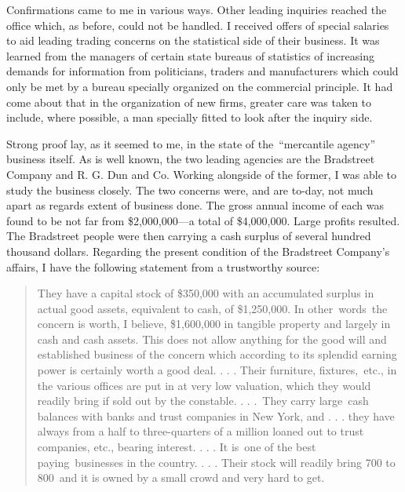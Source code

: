 \documentclass[twoside,symmetric,nobib,justified]{tufte-book}
\begin{document}
Confirmations came to me in various ways. Other leading inquiries
reached the office which, as before, could not be handled. I received
offers of special salaries to aid leading trading concerns on the
statistical side of their business. It was learned from the managers of
certain state bureaus of statistics of increasing demands for
information from politicians, traders and manufacturers which could only
be met by a bureau specially organized on the commercial principle. It
had come about that in the organization of new firms, greater care was
taken to include, where possible, a man specially fitted to look after
the inquiry side. ~

Strong proof lay, as it seemed to me, in the state of the~``mercantile
agency'' business itself. As is well known, the two leading agencies are
the Bradstreet Company and R. G. Dun and Co. Working alongside of the
former, I was able to study the business closely. The two concerns were,
and are to-day, not much apart as regards extent of business done. The
gross annual income of each was found to be not far from \$2,000,000---a
total of \$4,000,000. Large profits resulted. The Bradstreet people were
then carrying a cash surplus of several hundred thousand dollars.
Regarding the present condition of the Bradstreet Company's affairs, I
have the following statement from a trustworthy source:

\begin{quote}
They have a capital stock of \$350,000 with an accumulated surplus in
actual good assets, equivalent to cash, of \$1,250,000. In
other~words~the concern is worth, I believe, \$1,600,000 in tangible
property and largely in cash and cash assets. This does not allow
anything for the good will and established business of the concern which
according to its splendid earning power is certainly worth a good deal.
. . . Their furniture, fixtures,~etc., in the various offices are put in
at very low valuation, which they would readily bring if sold out by the
constable. . . .~They carry large~cash balances with banks and trust
companies in New York, and . . . they have always from a half to
three-quarters of a million loaned out to trust companies, etc., bearing
interest. . . . It is~one of the best paying~businesses in the country.
. . . Their stock will readily bring 700 to 800~and it is owned by a
small crowd and very hard to get.~
\end{quote}
\end{document}
